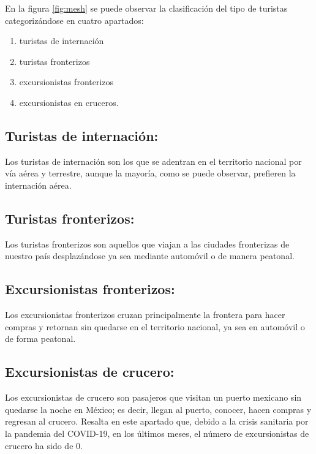 \documentclass[]{article}
\begin{document}
En la figura \ref{fig:mesh} se puede observar la clasificación del tipo de turistas categorizándose en cuatro apartados:
\begin{enumerate}
	\item turistas de internación
	\item  turistas fronterizos 
	\item excursionistas fronterizos
	\item excursionistas en cruceros.
\end{enumerate}
\subsection*{Turistas de internación:}
Los turistas de internación son los que se adentran en el territorio nacional por vía aérea y terrestre, aunque la mayoría, como se puede observar, prefieren la internación aérea.
\subsection*{Turistas fronterizos:}
Los turistas fronterizos son aquellos que viajan a las ciudades fronterizas de nuestro país desplazándose ya sea mediante automóvil o de manera peatonal.
\subsection*{Excursionistas fronterizos:}
Los excursionistas fronterizos cruzan principalmente la frontera para hacer compras y retornan sin quedarse en el territorio nacional, ya sea en automóvil o de forma peatonal. 
\subsection*{Excursionistas de crucero:}
Los excursionistas de crucero son pasajeros que visitan un puerto mexicano sin quedarse la noche en México; es decir, llegan al puerto, conocer, hacen compras y regresan al crucero. Resalta en este apartado que, debido a la crisis sanitaria por la pandemia del COVID-19, en los últimos meses, el número de excursionistas de crucero ha sido de 0.
		
\newpage
\end{document}
